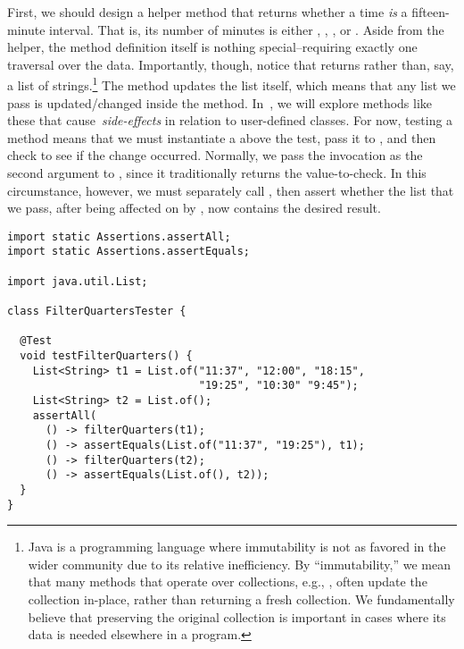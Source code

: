 First, we should design a helper method that returns whether a time \emph{is} a fifteen-minute interval.
That is, its number of minutes is either , , , or .
Aside from the helper, the method definition itself is nothing special--requiring exactly one traversal over the data.
Importantly, though, notice that  returns  rather than, say, a list of strings.\footnote{Java is a programming language where immutability is not as favored in the wider community due to its relative inefficiency. By ``immutability,'' we mean that many methods that operate over collections, e.g., , often update the collection in-place, rather than returning a fresh collection. We fundamentally believe that preserving the original collection is important in cases where its data is needed elsewhere in a program.}
The method updates the  list itself, which means that any list we pass is updated/changed inside the method.
In~, we will explore methods like these that cause~\emph{side-effects} in relation to user-defined classes.
For now, testing a  method means that we must instantiate a  above the test, pass it to , and then check to see if the change occurred.
Normally, we pass the  invocation as the second argument to , since it traditionally returns the value-to-check.
In this circumstance, however, we must separately call , then assert whether the list that we pass, after being affected on by , now contains the desired result.

\begin{lstlisting}[language=MyJava]
import static Assertions.assertAll;
import static Assertions.assertEquals;

import java.util.List;

class FilterQuartersTester {

  @Test
  void testFilterQuarters() {
    List<String> t1 = List.of("11:37", "12:00", "18:15", 
                              "19:25", "10:30" "9:45");
    List<String> t2 = List.of();
    assertAll(
      () -> filterQuarters(t1);
      () -> assertEquals(List.of("11:37", "19:25"), t1);
      () -> filterQuarters(t2);
      () -> assertEquals(List.of(), t2));
  }
}
\end{lstlisting}

